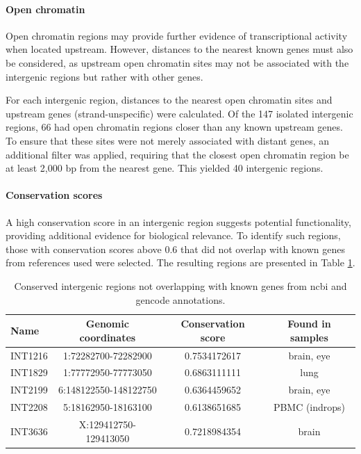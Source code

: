 \paragraph{Open chromatin}

Open chromatin regions may provide further evidence of transcriptional activity when located upstream.
However, distances to the nearest known genes must also be considered,
as upstream open chromatin sites may not be associated with the intergenic regions but rather with other genes.

For each intergenic region, distances to the nearest open chromatin sites and upstream genes (strand-unspecific) were calculated.
Of the 147 isolated intergenic regions, 66 had open chromatin regions closer than any known upstream genes.
To ensure that these sites were not merely associated with distant genes, an additional filter was applied, 
requiring that the closest open chromatin region be at least 2,000 bp from the nearest gene.
This yielded 40 intergenic regions.

\paragraph{Conservation scores}

A high conservation score in an intergenic region suggests potential functionality, providing additional evidence for biological relevance.
To identify such regions, those with conservation scores above 0.6 that did not overlap with known genes from references used were selected.
The resulting regions are presented in Table \ref{tab:conservedIntergenic}.

\begin{table}[h]
    \centering
    \begin{tabular}{lccc}
        \toprule
        Name & Genomic coordinates & Conservation score & Found in samples \\
        \midrule
        INT1216 & 1:72282700-72282900 & 0.7534172617 & brain, eye\\
	INT1829 & 1:77772950-77773050 & 0.6863111111 & lung \\
	INT2199 & 6:148122550-148122750 & 0.6364459652 & brain, eye \\
	INT2208 & 5:18162950-18163100 & 0.6138651685 & PBMC (indrops) \\
	INT3636 & X:129412750-129413050 & 0.7218984354 & brain \\
        \bottomrule
    \end{tabular}
    \caption{Conserved intergenic regions not overlapping with known genes from ncbi and gencode annotations.}
    \label{tab:conservedIntergenic}
\end{table}

